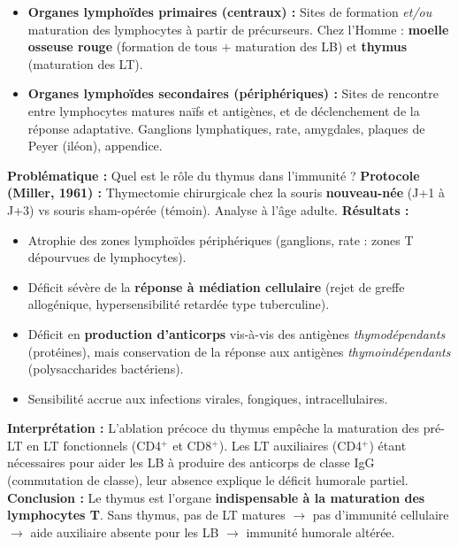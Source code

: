 \documentclass[11pt]{article}
\begin{document}
\begin{definition}
\begin{itemize}
    \item \textbf{Organes lymphoïdes primaires (centraux) :} Sites de formation \emph{et/ou} maturation des lymphocytes à partir de précurseurs. Chez l'Homme : \textbf{moelle osseuse rouge} (formation de tous $+$ maturation des LB) et \textbf{thymus} (maturation des LT).
    \item \textbf{Organes lymphoïdes secondaires (périphériques) :} Sites de rencontre entre lymphocytes matures naïfs et antigènes, et de déclenchement de la réponse adaptative. Ganglions lymphatiques, rate, amygdales, plaques de Peyer (iléon), appendice.
\end{itemize}
\end{definition}

\begin{experience}
\textbf{Problématique :} Quel est le rôle du thymus dans l'immunité ?
\textbf{Protocole (Miller, 1961) :} Thymectomie chirurgicale chez la souris \textbf{nouveau-née} (J+1 à J+3) vs souris sham-opérée (témoin). Analyse à l'âge adulte.
\textbf{Résultats :}
\begin{itemize}
    \item Atrophie des zones lymphoïdes périphériques (ganglions, rate : zones T dépourvues de lymphocytes).
    \item Déficit sévère de la \textbf{réponse à médiation cellulaire} (rejet de greffe allogénique, hypersensibilité retardée type tuberculine).
    \item Déficit en \textbf{production d'anticorps} vis-à-vis des antigènes \emph{thymodépendants} (protéines), mais conservation de la réponse aux antigènes \emph{thymoindépendants} (polysaccharides bactériens).
    \item Sensibilité accrue aux infections virales, fongiques, intracellulaires.
\end{itemize}
\textbf{Interprétation :} L'ablation précoce du thymus empêche la maturation des pré-LT en LT fonctionnels (CD4$^+$ et CD8$^+$). Les LT auxiliaires (CD4$^+$) étant nécessaires pour aider les LB à produire des anticorps de classe IgG (commutation de classe), leur absence explique le déficit humorale partiel.
\textbf{Conclusion :} Le thymus est l'organe \textbf{indispensable à la maturation des lymphocytes T}. Sans thymus, pas de LT matures $\rightarrow$ pas d'immunité cellulaire $\rightarrow$ aide auxiliaire absente pour les LB $\rightarrow$ immunité humorale altérée.
\end{experience}
\end{document}
